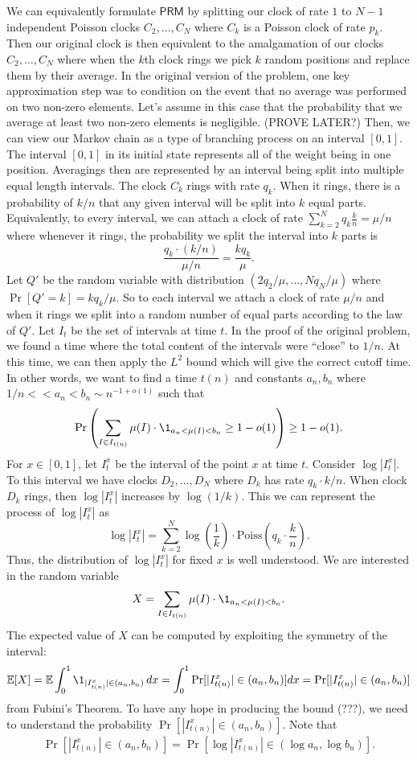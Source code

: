 \documentclass[12pt]{article}
\begin{document}
We can equivalently formulate $\mathsf{PRM}$ by splitting our clock of rate $1$ to $N-1$ independent Poisson clocks $C_2, \ldots, C_N$ where $C_k$ is a Poisson clock of rate $p_k$. Then our original clock is then equivalent to the amalgamation of our clocks $C_2, \ldots, C_N$ where when the $k$th clock rings we pick $k$ random positions and replace them by their average. In the original version of the problem, one key approximation step was to condition on the event that no average was performed on two non-zero elements. Let's assume in this case that the probability that we average at least two non-zero elements is negligible. (PROVE LATER?) Then, we can view our Markov chain as a type of branching process on an interval $[0, 1]$. The interval $[0, 1]$ in its initial state represents all of the weight being in one position. Averagings then are represented by an interval being split into multiple equal length intervals. The clock $C_k$ rings with rate $q_k$. When it rings, there is a probability of $k/n$ that any given interval will be split into $k$ equal parts. Equivalently, to every interval, we can attach a clock of rate $\sum_{k = 2}^N q_k \frac{k}{n} = \mu / n$ where whenever it rings, the probability we split the interval into $k$ parts is 
\[
	\frac{q_k \cdot (k/n)}{\mu /n} = \frac{k q_k}{\mu}.
\]
Let $Q'$ be the random variable with distribution $(2q_2/\mu, \ldots, Nq_N/\mu)$ where $\Pr[Q' = k] = kq_k / \mu$. So to each interval we attach a clock of rate $\mu / n$ and when it rings we split into a random number of equal parts according to the law of $Q'$. Let $I_t$ be the set of intervals at time $t$. In the proof of the original problem, we found a time where the total content of the intervals were ``close'' to $1/n$. At this time, we can then apply the $L^2$ bound which will give the correct cutoff time. In other words, we want to find a time $t(n)$ and constants $a_n, b_n$ where $1/n << a_n < b_n \sim n^{-1 + o(1)}$ such that 
\[
	\Pr \left ( \sum_{I \in I_{t(n)}} \mu(I) \cdot \1_{a_n < \mu(I) < b_n}  \geq 1 - o(1) \right ) \geq 1 - o(1).
\]
For $x \in [0, 1]$, let $I_t^x$ be the interval of the point $x$ at time $t$. Consider $\log |I_t^x|$. To this interval we have clocks $D_2, \ldots, D_N$ where $D_k$ has rate $q_k \cdot k/n$. When clock $D_k$ rings, then $\log |I_t^x|$ increases by $\log (1/k)$. This we can represent the process of $\log |I_t^x|$ as 
\[
	\log |I_t^x| = \sum_{k = 2}^N \log \left ( \frac{1}{k} \right ) \cdot \text{Poiss} \left (q_k \cdot \frac{k}{n}\right ).
\]
Thus, the distribution of $\log |I_t^x|$ for fixed $x$ is well understood. We are interested in the random variable 
\[
	X = \sum_{I \in I_{t(n)}} \mu(I) \cdot \1_{a_n < \mu(I) < b_n}.
\] 
The expected value of $X$ can be computed by exploiting the symmetry of the interval:
\[
	\EE[X] = \EE \int_0^1 \1_{|I_{t(n)}^x| \in (a_n, b_n)} \, dx = 	\int_0^1 \Pr[|I_{t(n)}^x| \in (a_n, b_n)] dx = \Pr[|I_{t(n)}^x| \in (a_n, b_n)]
\]
from Fubini's Theorem. To have any hope in producing the bound (???), we need to understand the probability $\Pr[|I_{t(n)}^x| \in (a_n, b_n)]$. Note that 
\begin{align*}
	\Pr[|I_{t(n)}^x| \in (a_n, b_n)] = \Pr[\log |I_{t(n)}^x| \in (\log a_n, \log b_n)].
\end{align*}
\end{document}
